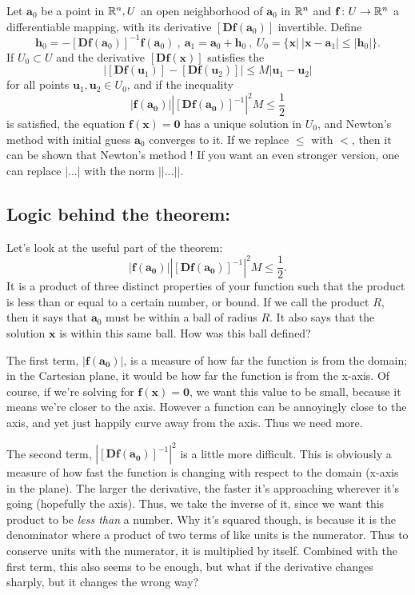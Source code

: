 \documentclass{article}
\newcommand{\pt}[1]{\mathbf{#1}}
\renewcommand{\vec}[1]{\mathbf{#1}}
\newcommand{\df}[1]{[\mathbf{D}\vec{f}(#1)]}
\begin{document}
Let $\pt{a}_0$ be a point in $\Bbb{R}^n, U$ an open neighborhood of
$\pt{a}_0$ in $\Bbb{R}^n$ and $\vec{f}\colon U\rightarrow\Bbb{R}^n$ a
differentiable mapping, with its derivative $\df{\pt{a}_0}$
invertible. Define
\[
\vec{h}_0=-\df{\pt{a}_0}^{-1}\vec{f}(\pt{a}_0)\: ,\: \pt{a}_1=\pt{a}_0 + \vec{h}_0\: ,\: U_0 = \{\pt{x}|\: |\pt{x}-\pt{a}_1|\leq |\vec{h}_0|\}.
\]
If $U_0\subset U$ and the derivative $\df{\pt{x}}$ satisfies the
\[
|\df{\pt{u}_1} - \df{\pt{u}_2}|\leq M|\pt{u}_1-\pt{u}_2|
\]
for all points $\pt{u}_1,\pt{u}_2\in U_0$, and if the inequality
\[
\left|\vec{f}(\pt{a_0})\right|\left|\df{\pt{a_0}}^{-1}\right|^2M\leq\frac{1}{2}
\]
is satisfied, the equation $\vec{f}(\pt{x})=\vec{0}$ has a unique
solution in $U_0$, and Newton's method with initial guess $\pt{a}_0$
converges to it.  If we replace $\leq$ with $<$, then it can be shown
that Newton's method ! If you want an
even stronger version, one can replace $|...|$ with the norm
$||...||$.

\subsection*{Logic behind the theorem:} 
Let's look at the useful part of the theorem:
\[
\left|\vec{f}(\pt{a_0})\right|\left|\df{\pt{a_0}}^{-1}\right|^2M\leq\frac{1}{2}.
\]
It is a product of three distinct properties of your function such
that the product is less than or equal to a certain number, or
bound. If we call the product $R$, then it says that $\pt{a}_0$ must
be within a ball of radius $R$. It also says that the solution
$\pt{x}$ is within this same ball. How was this ball defined?

The first term, $|\vec{f}(\pt{a_0})|$, is a measure of how far the
function is from the domain; in the Cartesian plane, it would be how
far the function is from the x-axis. Of course, if we're solving for
$\vec{f}(\pt{x})=\vec{0}$, we want this value to be small, because it
means we're closer to the axis. However a function can be annoyingly
close to the axis, and yet just happily curve away from the axis. Thus
we need more.

The second term, $|\df{\pt{a_0}}^{-1}|^2$ is a little more
difficult. This is obviously a measure of how fast the function is
changing with respect to the domain (x-axis in the plane). The larger
the derivative, the faster it's approaching wherever it's going
(hopefully the axis). Thus, we take the inverse of it, since we want
this product to be \emph{less than} a number. Why it's squared though,
is because it is the denominator where a product of two terms of like
units is the numerator. Thus to conserve units with the numerator, it
is multiplied by itself. Combined with the first term, this also seems
to be enough, but what if the derivative changes sharply, but it
changes the wrong way?
\end{document}
